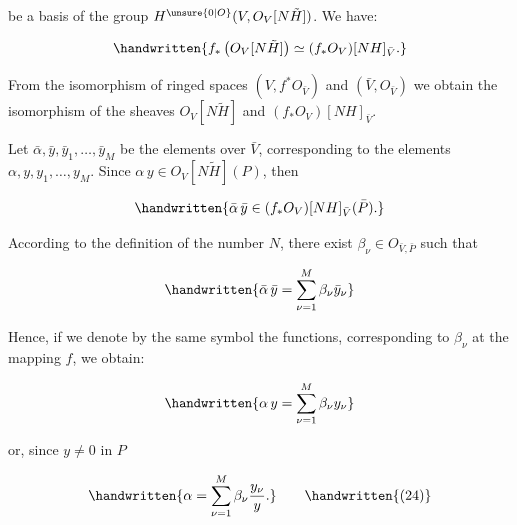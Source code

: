 
be a basis of the group $H^{\unsure{0|O}}(V,O_V[N\tilde H])$. We have:

\[
\handwritten{f_*\left(O_V[N\tilde H]\right)\simeq(f_*O_V)[NH]_{\bar V}.}
\]

From the isomorphism of ringed spaces $(V,f^*O_{\bar V})$ and $(\bar V,O_{\bar V})$
we obtain the isomorphism of the sheaves $O_V[N\tilde H]$ and
$(f_*O_V)[NH]_{\bar V}$.

Let $\bar\alpha,\bar y,\bar y_1,\ldots,\bar y_M$ be the elements over $\bar V$, corresponding
to the elements $\alpha,y,y_1,\ldots,y_M$. Since $\alpha\,y\in O_V[N\tilde H](P)$, then

\[
\handwritten{\bar\alpha\,\bar y\in(f_*O_V)[NH]_{\bar V}(\bar P).}
\]

According to the definition of the number $N$, there
exist $\beta_\nu\in O_{\bar V,\bar P}$ such that

\[
\handwritten{\bar\alpha\,\bar y=\sum_{\nu=1}^{M}\beta_\nu\bar y_\nu}
\]

Hence, if we denote by the same symbol the functions,
corresponding to $\beta_\nu$ at the mapping $f$, we obtain:

\[
\handwritten{\alpha\,y=\sum_{\nu=1}^{M}\beta_\nu  y_\nu}
\]

or, since $y\ne0$ in $P$

\[
\handwritten{\alpha=\sum_{\nu=1}^{M}\beta_\nu\frac{y_\nu}{y}.}\tag*{\handwritten{(24)}}
\]

